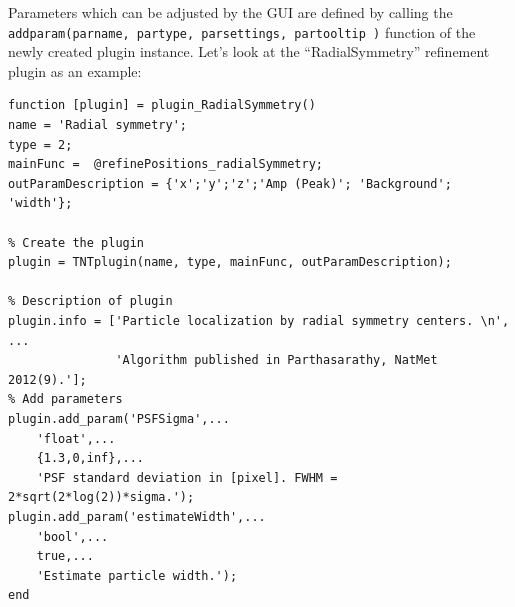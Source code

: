\documentclass[11pt,onside]{report}
\numberwithin{equation}{chapter}
\begin{document}
Parameters which can be adjusted by the GUI are defined by calling the \texttt{add\textunderscore param(par\textunderscore name, par\textunderscore type, par\textunderscore settings, par\textunderscore tooltip )} function of the newly created plugin instance. Let's look at the ``RadialSymmetry'' refinement plugin as an example:
\begin{lstlisting}[style=Matlab-editor]
function [plugin] = plugin_RadialSymmetry()
name = 'Radial symmetry';
type = 2;
mainFunc =  @refinePositions_radialSymmetry;
outParamDescription = {'x';'y';'z';'Amp (Peak)'; 'Background'; 'width'};

% Create the plugin
plugin = TNTplugin(name, type, mainFunc, outParamDescription);

% Description of plugin
plugin.info = ['Particle localization by radial symmetry centers. \n', ...
               'Algorithm published in Parthasarathy, NatMet 2012(9).'];
% Add parameters
plugin.add_param('PSFSigma',...
    'float',...
    {1.3,0,inf},...
    'PSF standard deviation in [pixel]. FWHM = 2*sqrt(2*log(2))*sigma.');
plugin.add_param('estimateWidth',...
    'bool',...
    true,...
    'Estimate particle width.');
end
\end{lstlisting}
 
\end{document}
